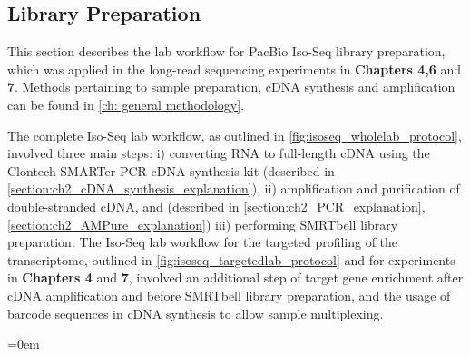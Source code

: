 \subsection{Library Preparation}
\label{chap:isoseq_labpipeline}
This section describes the lab workflow for PacBio Iso-Seq library preparation, which was applied in the long-read sequencing experiments in \textbf{Chapters 4,6} and \textbf{7}. Methods pertaining to sample preparation, cDNA synthesis and amplification can be found in \cref{ch: general methodology}.

The complete Iso-Seq lab workflow, as outlined in \cref{fig:isoseq_wholelab_protocol}, involved three main steps: i) converting RNA to full-length cDNA using the Clontech SMARTer PCR cDNA synthesis kit (described in \cref{section:ch2_cDNA_synthesis_explanation}), ii) amplification and purification of double-stranded cDNA, and (described in \cref{section:ch2_PCR_explanation}, \cref{section:ch2_AMPure_explanation}) iii) performing SMRTbell library preparation. The Iso-Seq lab workflow for the targeted profiling of the transcriptome, outlined in \cref{fig:isoseq_targetedlab_protocol} and for experiments in \textbf{Chapters 4} and \textbf{7}, involved an additional step of target gene enrichment after cDNA amplification and before SMRTbell library preparation, and the usage of barcode sequences in cDNA synthesis to allow sample multiplexing.

\begingroup
\parindent=0em
\localtableofcontents 
\endgroup

